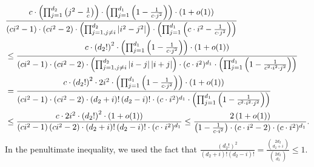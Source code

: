 \documentclass[10pt,a4paper]{article}
\newcommand{\<}{\langle}
\renewcommand{\>}{\rangle}
\begin{document}
\begin{align}
& \frac{c\cdot \left( \prod_{j=1}^{d_{2}}\left( j^{2}-\frac{1}{c}\right)
\right) \cdot \left( \prod_{j=1}^{d_{1}}\left( 1-\frac{1}{c\cdot j^{2}}
\right) \right) \cdot (1+o(1))}{\left( ci^{2}-1\right) \cdot \left(
ci^{2}-2\right) \cdot \left( \prod_{j=1,j\neq i}^{d_{2}}\left\vert
i^{2}-j^{2}\right\vert \right) \cdot \left( \prod_{j=1}^{d_{1}}\left( c\cdot
i^{2}-\frac{1}{c\cdot j^{2}}\right) \right) }  \notag \\
& \leq \frac{c\cdot \left( d_{2}!\right) ^{2}\cdot \left(
\prod_{j=1}^{d_{1}}\left( 1-\frac{1}{c\cdot j^{2}}\right) \right) \cdot
(1+o(1))}{\left( ci^{2}-1\right) \cdot \left( ci^{2}-2\right) \cdot \left(
\prod_{j=1,j\neq i}^{d_{2}}\left\vert i-j\right\vert \left\vert
i+j\right\vert \right) \cdot (c\cdot i^{2})^{d_{1}}\cdot \left(
\prod_{j=1}^{d_{1}}\left( 1-\frac{1}{c^{2}\cdot i^{2}\cdot j^{2}}\right)
\right) }  \notag \\
& =\frac{c\cdot \left( d_{2}!\right) ^{2}\cdot 2i^{2}\cdot \left(
\prod_{j=1}^{d_{1}}\left( 1-\frac{1}{c\cdot j^{2}}\right) \right) \cdot
(1+o(1))}{\left( ci^{2}-1\right) \cdot \left( ci^{2}-2\right) \cdot \left(
d_{2}+i\right) !\left( d_{2}-i\right) !\cdot (c\cdot i^{2})^{d_{1}}\cdot
\left( \prod_{j=1}^{d_{1}}\left( 1-\frac{1}{c^{2}\cdot i^{2}\cdot j^{2}}
\right) \right) }  \notag \\
& \leq \frac{c\cdot 2i^{2}\cdot \left( d_{2}!\right) ^{2}\cdot (1+o(1))}{
\left( ci^{2}-1\right) \left( ci^{2}-2\right) \cdot \left( d_{2}+i\right)
!\left( d_{2}-i\right) !\cdot (c\cdot i^{2})^{d_{1}}}\leq \frac{2\left(
1+o(1)\right) }{\left( 1-\frac{1}{c\cdot i^{2}}\right) \cdot (c\cdot
i^{2}-2)\cdot (c\cdot i^{2})^{d_{1}}}.  \label{verylongequation}
\end{align}
In the penultimate inequality, we used the fact that $\frac{(d_{2}!)^{2}}{
(d_{2}+i)!(d_{2}-i)!}=\frac{\binom{2d_{2}}{d_{2}+i}}{\binom{2d_{2}}{d_{2}}}
\leq 1$.
\end{document}
